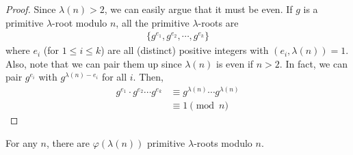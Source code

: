 \documentclass{subfile}
\begin{document}
	\begin{proof}
		Since $\lambda(n)>2$, we can easily argue that it must be even. If $g$ is a primitive $\lambda$-root modulo $n$, all the primitive $\lambda$-roots are
			\begin{align*}
				\{g^{e_1}, g^{e_2}, \cdots, g^{e_{k}}\}
			\end{align*}
		where $e_i$ (for $1 \leq i \leq k$) are all (distinct) positive integers with $(e_i, \lambda(n))=1$. Also, note that we can pair them up since $\lambda(n)$ is even if $n>2$. In fact, we can pair $g^{e_i}$ with $g^{\lambda(n)-e_i}$ for all $i$. Then,
		\begin{align*}
			g^{e_1}\cdot g^{e_2}\cdots g^{e_k}
				& \equiv g^{\lambda(n)}\cdots g^{\lambda(n)}\\
				& \equiv 1\pmod n
		\end{align*}
	\end{proof}

	\begin{corollary}
		For any $n$, there are $\varphi(\lambda(n))$ primitive $\lambda$-roots modulo $n$.
	\end{corollary}
\end{document}
